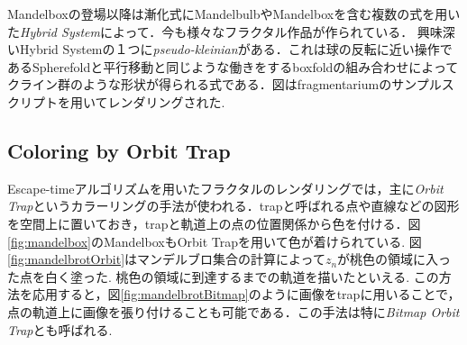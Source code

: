 Mandelboxの登場以降は漸化式にMandelbulbやMandelboxを含む複数の式を用いた{\it Hybrid System}によって．今も様々なフラクタル作品が作られている．
興味深いHybrid Systemの１つに{\it pseudo-kleinian}がある．これは球の反転に近い操作であるSpherefoldと平行移動と同じような働きをするboxfoldの組み合わせによってクライン群のような形状が得られる式である．図はfragmentariumのサンプルスクリプトを用いてレンダリングされた.

\subsection{Coloring by Orbit Trap}

Escape-timeアルゴリズムを用いたフラクタルのレンダリングでは，主に{\it Orbit Trap}というカラーリングの手法が使われる．trapと呼ばれる点や直線などの図形を空間上に置いておき，trapと軌道上の点の位置関係から色を付ける．図\ref{fig:mandelbox}のMandelboxもOrbit Trapを用いて色が着けられている.
図\ref{fig:mandelbrotOrbit}はマンデルブロ集合の計算によって$z_n$が桃色の領域に入った点を白く塗った.
桃色の領域に到達するまでの軌道を描いたといえる. この方法を応用すると，図\ref{fig:mandelbrotBitmap}のように画像をtrapに用いることで，点の軌道上に画像を張り付けることも可能である．この手法は特に{\it Bitmap Orbit Trap}とも呼ばれる.

